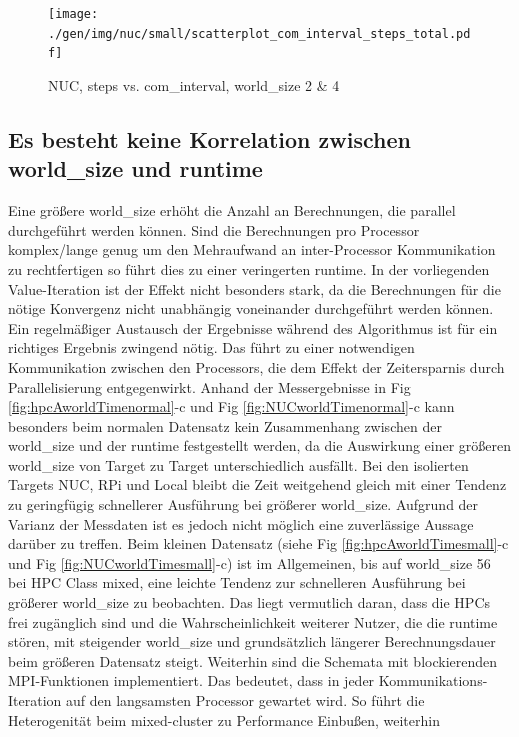 \begin{figure}[h]
\texttt{[image: ./gen/img/nuc/small/scatterplot\_com\_interval\_steps\_total.pdf]}
\vspace*{-8mm}
\caption{NUC, steps vs. com\_interval, world\_size 2 \& 4}
\label{fig:ScatStepCom}
\end{figure}

\subsection{Es besteht keine Korrelation zwischen world\_size und runtime}

Eine größere world\_size erhöht die Anzahl an Berechnungen, die parallel durchgeführt werden können.
Sind die Berechnungen pro Processor komplex/lange genug um den Mehraufwand an inter-Processor Kommunikation zu
rechtfertigen so führt dies zu einer veringerten runtime.
In der vorliegenden Value-Iteration ist der Effekt nicht besonders stark, da die Berechnungen für die nötige
Konvergenz nicht unabhängig voneinander durchgeführt werden können. Ein regelmäßiger Austausch der Ergebnisse während des Algorithmus ist für ein
richtiges Ergebnis zwingend nötig. Das führt zu einer notwendigen Kommunikation zwischen den Processors,
die dem Effekt der Zeitersparnis durch Parallelisierung entgegenwirkt.
Anhand der Messergebnisse in Fig \ref{fig:hpcAworldTimenormal}-c und Fig \ref{fig:NUCworldTimenormal}-c kann besonders beim normalen Datensatz
kein Zusammenhang zwischen der world\_size und der runtime festgestellt werden, da
die Auswirkung einer größeren world\_size von Target zu Target unterschiedlich ausfällt.
Bei den isolierten Targets NUC, RPi und Local bleibt die Zeit weitgehend gleich mit einer Tendenz zu geringfügig schnellerer Ausführung
bei größerer world\_size. Aufgrund der Varianz der Messdaten ist es jedoch nicht möglich eine zuverlässige Aussage darüber zu treffen.
Beim kleinen Datensatz (siehe Fig \ref{fig:hpcAworldTimesmall}-c und Fig \ref{fig:NUCworldTimesmall}-c) ist im Allgemeinen,
bis auf world\_size 56 bei HPC Class mixed, eine leichte Tendenz zur schnelleren Ausführung bei größerer world\_size zu beobachten.
Das liegt vermutlich daran, dass die HPCs frei zugänglich sind und die Wahrscheinlichkeit weiterer Nutzer, die die runtime
stören, mit steigender world\_size und grundsätzlich längerer Berechnungsdauer beim größeren Datensatz steigt.
Weiterhin sind die Schemata mit blockierenden MPI-Funktionen implementiert. Das bedeutet, dass in jeder Kommunikations-Iteration
auf den langsamsten Processor gewartet wird. So führt die Heterogenität beim mixed-cluster zu Performance Einbußen, weiterhin

